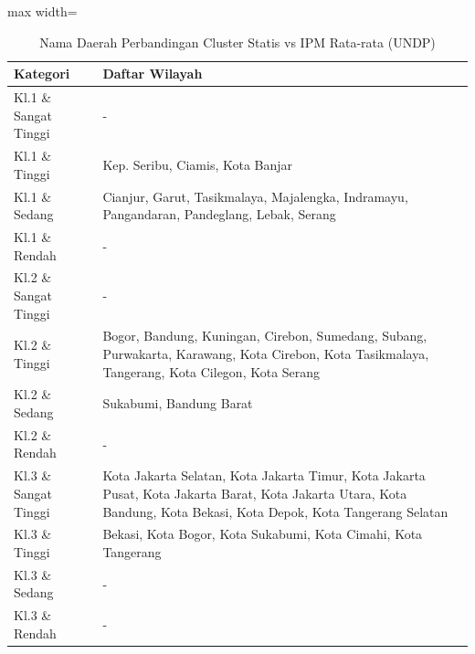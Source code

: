 \begin{table}[H]
\centering
\caption{Nama Daerah Perbandingan Cluster Statis vs IPM Rata-rata (UNDP)} \label{tab:appstatis_ipm_avg_name}
\begin{adjustbox}{max width=\textwidth}
\begin{tabular}{|p{4cm}|p{10cm}|}
\hline
\textbf{Kategori} & \textbf{Daftar Wilayah} \\
\hline
Kl.1 \& Sangat Tinggi & - \\
\hline
Kl.1 \& Tinggi & Kep. Seribu, Ciamis, Kota Banjar \\
\hline
Kl.1 \& Sedang & Cianjur, Garut, Tasikmalaya, Majalengka, Indramayu, Pangandaran, Pandeglang, Lebak, Serang \\
\hline
Kl.1 \& Rendah & - \\
\hline
Kl.2 \& Sangat Tinggi & - \\
\hline
Kl.2 \& Tinggi & Bogor, Bandung, Kuningan, Cirebon, Sumedang, Subang, Purwakarta, Karawang, Kota Cirebon, Kota Tasikmalaya, Tangerang, Kota Cilegon, Kota Serang \\
\hline
Kl.2 \& Sedang & Sukabumi, Bandung Barat \\
\hline
Kl.2 \& Rendah & - \\
\hline
Kl.3 \& Sangat Tinggi & Kota Jakarta Selatan, Kota Jakarta Timur, Kota Jakarta Pusat, Kota Jakarta Barat, Kota Jakarta Utara, Kota Bandung, Kota Bekasi, Kota Depok, Kota Tangerang Selatan \\
\hline
Kl.3 \& Tinggi & Bekasi, Kota Bogor, Kota Sukabumi, Kota Cimahi, Kota Tangerang \\
\hline
Kl.3 \& Sedang & - \\
\hline
Kl.3 \& Rendah & - \\
\hline
\end{tabular}
\end{adjustbox}
\end{table}